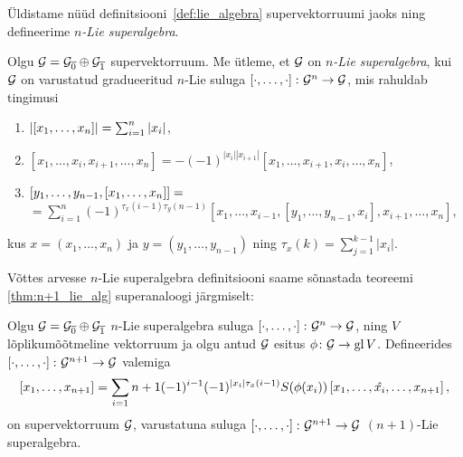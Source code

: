Üldistame nüüd definitsiooni~\ref{def:lie_algebra} supervektorruumi jaoks
ning defineerime \emph{$n$-Lie superalgebra}.

\begin{dfn}
    Olgu $\mathcal{G} = \mathcal{G}_{\overline{0}} \oplus \mathcal{G}_{\overline{1}}$ 
    supervektorruum. Me ütleme, et $\mathcal{G}$ on
    \emph{$n$-Lie superalgebra}, kui $\mathcal{G}$ on varustatud
    gradueeritud $n$-Lie suluga $\left[ \cdot, \dots, \cdot \right] \colon \mathcal{G}^n \rightarrow \mathcal{G}$,
    mis rahuldab tingimusi
    \begin{enumerate}
        \item $\left| \left[ x_1, \dots, x_n \right] \right| = \sum_{i=1}^n |x_i| $,
        \item $\left[ x_1, \dots, x_i, x_{i+1}, \dots, x_n \right] =
            -(-1)^{|x_i| |x_{i+1}|} \left[
                x_1, \dots, x_{i+1}, x_i, \dots, x_n
            \right]$,
        \item $\left[ y_1, \dots, y_{n-1}, \left[ x_1, \dots, x_n \right] \right] = $ \\
            $ = \sum_{i=1}^n (-1)^{\tau_x (i-1) \tau_y (n-1)}
            \left[
                x_1, \dots, x_{i-1},
                \left[ y_1, \dots, y_{n-1}, x_i \right],
                x_{i+1}, \dots, x_n
            \right] $,
    \end{enumerate}
    kus $x = (x_1, \dots, x_n)$ ja $y = (y_1, \dots, y_{n-1})$ ning
    $\tau_x (k) = \sum_{j=1}^{k-1} |x_i|$.
\end{dfn}

Võttes arvesse $n$-Lie superalgebra definitsiooni saame sõnastada 
teoreemi \ref{thm:n+1_lie_alg} superanaloogi järgmiselt:

\begin{thm}
    Olgu $\mathcal{G} = \mathcal{G}_{\overline{0}} \oplus \mathcal{G}_{\overline{1}}$
    $n$-Lie superalgebra suluga $\left[ \cdot, \dots, \cdot \right] \colon \mathcal{G}^n \rightarrow \mathcal{G}$,
    ning $V$ lõplikumõõtmeline vektorruum ja olgu
    antud $\mathcal{G}$ esitus $\phi \colon \mathcal{G} \rightarrow \operatorname{gl} V$. Defineerides
    $\left[ \cdot, \dots, \cdot \right] \colon \mathcal{G}^{n+1} \rightarrow \mathcal{G}$ valemiga
    \[
        \left[ x_1, \dots, x_{n+1} \right] = \sum_{i=1}{n+1}
        (-1)^{i-1} (-1)^{|x_i| \tau_x (i-1)} S(\phi(x_i))
        \left[ x_1, \dots, \hat{x_i}, \dots, x_{n+1} \right],
    \]
    on supervektorruum $\mathcal{G}$, varustatuna suluga
    $\left[ \cdot, \dots, \cdot \right] \colon \mathcal{G}^{n+1} \rightarrow \mathcal{G}$ $(n+1)$-Lie
    superalgebra.
\end{thm}
